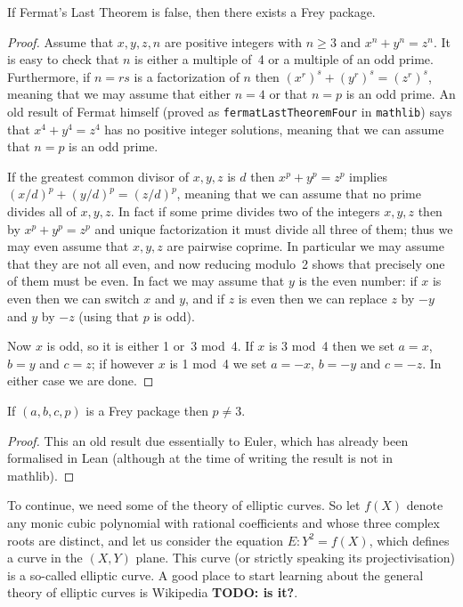 \begin{lemma}\label{WLOG_n_prime}
  If Fermat's Last Theorem is false, then there exists a Frey package.
\end{lemma}
\begin{proof}
  Assume that $x,y,z,n$ are positive integers with $n\geq3$ and $x^n+y^n=z^n$. It is easy to check that $n$ is either a multiple of~4 or a multiple of an odd prime. Furthermore, if $n=rs$ is a factorization of $n$ then $(x^r)^s+(y^r)^s=(z^r)^s$, meaning that we may assume that either $n=4$ or that $n=p$ is an odd prime. An old result of Fermat himself (proved as {\tt fermatLastTheoremFour} in {\tt mathlib}) says that $x^4+y^4=z^4$ has no positive integer solutions, meaning that we can assume that $n=p$ is an odd prime.

  If the greatest common divisor of $x,y,z$ is $d$ then $x^p+y^p=z^p$ implies $(x/d)^p+(y/d)^p=(z/d)^p$, meaning that we can assume that no prime divides all of $x,y,z$. In fact if some prime divides two of the integers $x,y,z$ then by $x^p+y^p=z^p$ and unique factorization it must divide all three of them; thus we may even assume that $x,y,z$ are pairwise coprime. In particular we may assume that they are not all even, and now reducing modulo~2 shows that precisely one of them must be even. In fact we may assume that $y$ is the even number: if $x$ is even then we can switch $x$ and $y$, and if $z$ is even then we can replace $z$ by $-y$ and $y$ by $-z$ (using that $p$ is odd).

  Now $x$ is odd, so it is either 1 or~3 mod~4. If $x$ is 3 mod~4 then we set $a=x$, $b=y$ and $c=z$; if however $x$ is 1 mod~4 we set $a=-x$, $b=-y$ and $c=-z$. In either case we are done.
\end{proof}

\begin{lemma}\label{WLOG_p_at_least_5} If $(a,b,c,p)$ is a Frey package then $p\not=3$.
\end{lemma}
\begin{proof} This an old result due essentially to Euler, which has already been formalised in Lean (although at the time of writing the result is not in mathlib).
\end{proof}

To continue, we need some of the theory of elliptic curves. So let $f(X)$ denote any monic cubic polynomial with rational coefficients and whose three complex roots are distinct, and let us consider the equation $E:Y^2=f(X)$, which defines a curve in the $(X,Y)$ plane. This curve (or strictly speaking its projectivisation) is a so-called elliptic curve. A good place to start learning about the general theory of elliptic curves is Wikipedia {\bf TODO: is it?}. 

